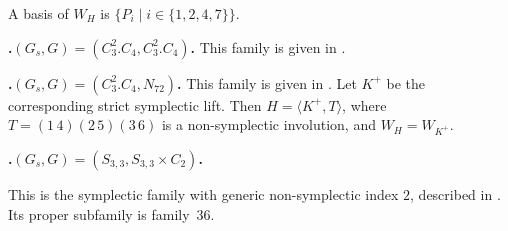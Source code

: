 \documentclass[12pt]{amsart}
\numberwithin{equation}{section}
\theoremstyle{plain}
\theoremstyle{definition}
\theoremstyle{remark}
\begin{document}
\par\smallskip\noindent A basis of $W_H$ is $\{P_i\mid i\in\{1, 2, 4, 7\}\}$.

\par{}\medskip\noindent\textbf{.\enspace $(G_s,G)=(C_3^2.C_4,C_3^2.C_4)$.}\label{fam:fourfold-no-33}
This family is given in \cite[(6.12)]{KOIKE202512}.

\par{}\medskip\noindent\textbf{.\enspace $(G_s,G)=(C_3^2.C_4,N_{72})$.}\label{fam:fourfold-no-34}
This family is given in \cite[(6.11)]{KOIKE202512}.
Let $K^+$ be the corresponding strict symplectic lift.  Then
$H=\langle K^+,T\rangle$, where $T=(1\,4)(2\,5)(3\,6)$ is a non-symplectic
involution, and $W_H=W_{K^+}$.

\par{}\medskip\noindent\textbf{.\enspace $(G_s,G)=(S_{3,3},S_{3,3}\times C_2)$.}\label{fam:fourfold-no-35}

This is the symplectic family with generic non-symplectic index $2$,
described in \cite[(6.13)]{KOIKE202512}.  Its proper subfamily is family~36.
\end{document}

